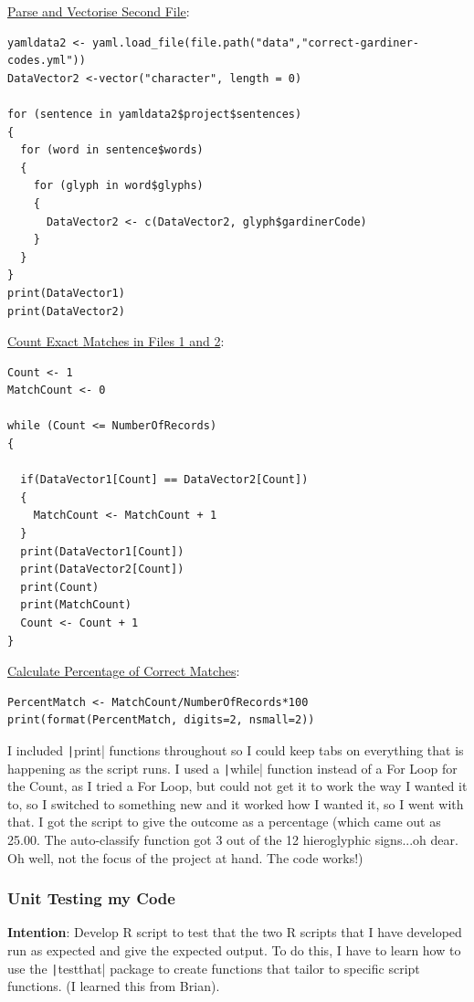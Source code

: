 \documentclass{article}
\begin{document}
\underline{Parse and Vectorise Second File}:

\begin{verbatim}
yamldata2 <- yaml.load_file(file.path("data","correct-gardiner-codes.yml"))
DataVector2 <-vector("character", length = 0)

for (sentence in yamldata2$project$sentences)
{
  for (word in sentence$words)
  {
    for (glyph in word$glyphs)
    {
      DataVector2 <- c(DataVector2, glyph$gardinerCode)
    }
  }
}
print(DataVector1)
print(DataVector2)
\end{verbatim}

\underline{Count Exact Matches in Files 1 and 2}:

\begin{verbatim}
Count <- 1
MatchCount <- 0

while (Count <= NumberOfRecords)
{
  
  if(DataVector1[Count] == DataVector2[Count])
  {
    MatchCount <- MatchCount + 1
  }
  print(DataVector1[Count])
  print(DataVector2[Count])
  print(Count)
  print(MatchCount)
  Count <- Count + 1
}
\end{verbatim}

\underline{Calculate Percentage of Correct Matches}:

\begin{verbatim}
PercentMatch <- MatchCount/NumberOfRecords*100
print(format(PercentMatch, digits=2, nsmall=2))
\end{verbatim}

I included \texttt|print| functions throughout so I could keep tabs on everything that is happening as the script runs. I used a \texttt|while| function instead of a For Loop for the Count, as I tried a For Loop, but could not get it to work the way I wanted it to, so I switched to something new and it worked how I wanted it, so I went with that. I got the script to give the outcome as a percentage (which came out as 25.00. The auto-classify function got 3 out of the 12 hieroglyphic signs...oh dear. Oh well, not the focus of the project at hand. The code works!)

\subsubsection{Unit Testing my Code}

\textbf{Intention}: Develop R script to test that the two R scripts that I have developed run as expected and give the expected output. To do this, I have to learn how to use the \texttt|testthat| package to create functions that tailor to specific script functions. (I learned this from Brian).
\end{document}
